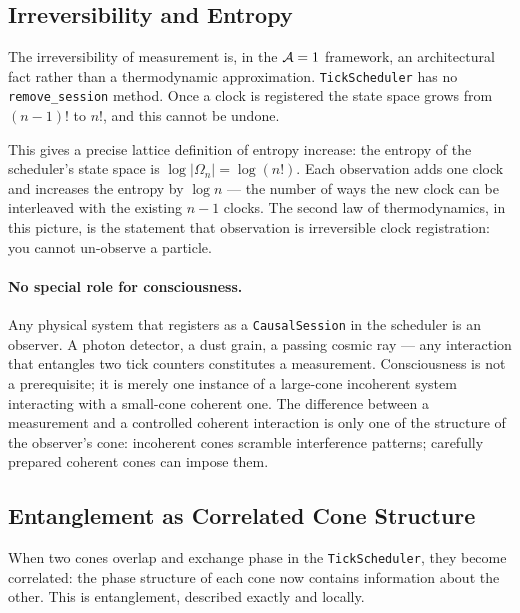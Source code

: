 \subsection{Irreversibility and Entropy}
\label{subsec:irreversibility}

The irreversibility of measurement is, in the $\mathcal{A}=1$ framework, an
architectural fact rather than a thermodynamic approximation.
\texttt{TickScheduler} has no \texttt{remove\_session} method.  Once a
clock is registered the state space grows from $(n-1)!$ to $n!$, and
this cannot be undone.

This gives a precise lattice definition of entropy increase: the
entropy of the scheduler's state space is $\log |\Omega_n| = \log(n!)$.
Each observation adds one clock and increases the entropy by
$\log n$ — the number of ways the new clock can be interleaved with the
existing $n-1$ clocks.  The second law of thermodynamics, in this
picture, is the statement that observation is irreversible clock
registration: you cannot un-observe a particle.

\paragraph{No special role for consciousness.}
Any physical system that registers as a \texttt{CausalSession} in the
scheduler is an observer.  A photon detector, a dust grain, a passing
cosmic ray — any interaction that entangles two tick counters constitutes
a measurement.  Consciousness is not a prerequisite; it is merely one
instance of a large-cone incoherent system interacting with a
small-cone coherent one.  The difference between a measurement and a
controlled coherent interaction is only one of the structure of the
observer's cone: incoherent cones scramble interference patterns;
carefully prepared coherent cones can impose them.

\subsection{Entanglement as Correlated Cone Structure}
\label{subsec:entanglement}

When two cones overlap and exchange phase in the \texttt{TickScheduler},
they become correlated: the phase structure of each cone now contains
information about the other.  This is entanglement, described exactly
and locally.

